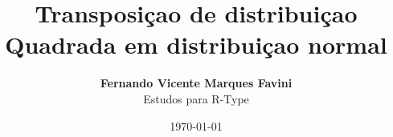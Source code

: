 \title{\huge{Transposiçao de distribuiçao Quadrada em distribuiçao normal}}
\author{{\bf Fernando Vicente Marques Favini} \\
\footnotesize{Estudos para R-Type}}
\date{\today}

